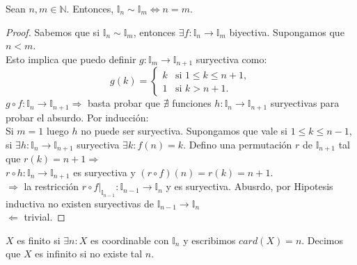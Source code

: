 \begin{theorem}
    Sean $n, m \in \mathbb{N}$. Entonces, $\mathbb{I}_n \sim \mathbb{I}_m \iff n = m$.
    \begin{proof}
        Sabemos que si $\mathbb{I}_n \sim \mathbb{I}_m$, entonces $\exists f: \mathbb{I}_n \to \mathbb{I}_m$ biyectiva. Supongamos que $n < m$. \\
        Esto implica que puedo definir $g: \mathbb{I}_m \to \mathbb{I}_{n+1}$ suryectiva como:
        \[
        g(k) = 
        \begin{cases} 
            k & \text{si } 1 \leq k \leq n+1, \\
            1 & \text{si } k > n+1.
        \end{cases}
        \]
        $g \circ f: \mathbb{I}_n \to \mathbb{I}_{n+1} \Rightarrow$ basta probar que $\nexists$ funciones $h: \mathbb{I}_n \to \mathbb{I}_{n+1}$ suryectivas para probar el absurdo. 
        Por inducción: \\
        Si $m=1$ luego $h$ no puede ser suryectiva. Supongamos que vale si $1 \leq k \leq n-1$, si $\exists h: \mathbb{I}_n \to \mathbb{I}_{n+1}$ suryectiva $\exists k : f(n) = k$. Defino una permutación $r$ de $\mathbb{I}_{n+1}$ tal que $r(k) = n+1 \Rightarrow$ \\
        $r \circ h: \mathbb{I}_n \to \mathbb{I}_{n+1}$ es suryectiva y $(r \circ f)(n) = r(k) = n+1$. \\
        $\Rightarrow$ la restricción $r \circ f|_{\mathbb{I}_{n-1}}:\mathbb{I}_{n-1} \to \mathbb{I}_n$ y es suryectiva. Abusrdo, por Hipotesis inductiva no existen suryectivas de $\mathbb{I}_{n-1} \to \mathbb{I}_n$ \\

        $\Leftarrow$ trivial.
    \end{proof}
\end{theorem}

\begin{definition}
    $X$ es finito si $\exists n: X$ es coordinable con $\mathbb{I}_n$ y escribimos $card(X)=n$. Decimos que $X$ es infinito si no existe tal $n$.
\end{definition}